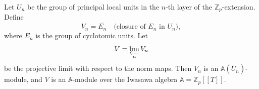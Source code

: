 Let $U_n$ be the group of principal local units in the $n$-th layer of the $\mathbb{Z}_p$-extension. Define
$$V_n = \overline{E_n} \quad \text{(closure of $E_n$ in $U_n$)},$$
where $E_n$ is the group of cyclotomic units. Let
$$V = \varprojlim_n V_n$$
be the projective limit with respect to the norm maps. Then $V_n$ is an $\mathbb{A}(\overline{U}_n)$-module, and $V$ is an $\mathbb{A}$-module over the Iwasawa algebra $\mathbb{A} = \mathbb{Z}_p[[T]]$.
